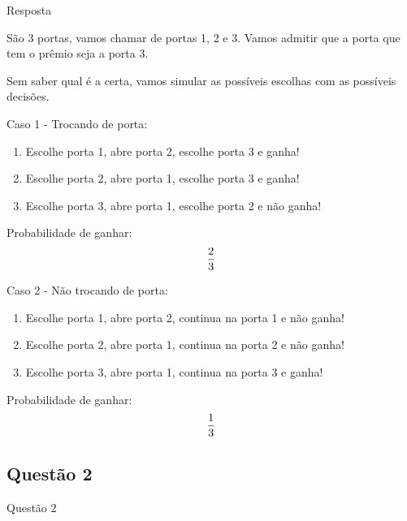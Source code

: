 \documentclass{beamer}
\begin{document}
\begin{frame}{Resposta}

São 3 portas, vamos chamar de portas 1, 2 e 3. Vamos admitir que a porta que tem o prêmio seja a porta 3.

Sem saber qual é a certa, vamos simular as possíveis escolhas com as possíveis decisões.

\end{frame}

\begin{frame}
	Caso 1 - Trocando de porta:
	\begin{enumerate}
		\item Escolhe porta 1, abre porta 2, escolhe porta 3 e ganha!
		\item Escolhe porta 2, abre porta 1, escolhe porta 3 e ganha!
		\item Escolhe porta 3, abre porta 1, escolhe porta 2 e não ganha!
	\end{enumerate}
	 Probabilidade de ganhar: $${2\over 3}$$
\end{frame}

\begin{frame}
	Caso 2 - Não trocando de porta:
	\begin{enumerate}
		\item Escolhe porta 1, abre porta 2, continua na porta 1 e não ganha!
		\item Escolhe porta 2, abre porta 1, continua na porta 2 e não ganha!
		\item Escolhe porta 3, abre porta 1, continua na porta 3 e ganha!
	\end{enumerate}
	 Probabilidade de ganhar: $${1\over 3}$$
\end{frame}

\subsection{Questão 2}

\begin{frame}{Questão 2}


\end{frame}
\end{document}
